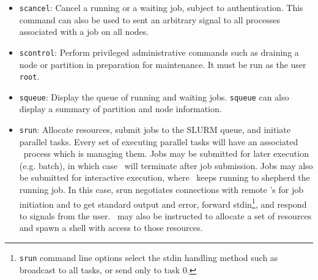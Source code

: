 \begin{itemize}
\item {\tt scancel}: Cancel a running or a waiting job, subject to
authentication. This command can also be used to sent an arbitrary 
signal to all processes associated with a job on all nodes.

\item {\tt scontrol}: Perform privileged administrative commands
such as draining a node or partition in preparation for maintenance. 
It must be run as the user {\tt root}.

\item {\tt squeue}: Display the queue of running and waiting jobs. 
{\tt squeue} can also display a summary of partition and node information.

\item {\tt srun}: Allocate resources, submit jobs to the SLURM queue,
and initiate parallel tasks. Every set of executing parallel tasks will
have an associated \srun\ process which is managing them. 
Jobs may be submitted for later execution (e.g. batch), in which case 
\srun\ will terminate after job submission. 
Jobs may also be submitted for interactive execution, where \srun\ keeps 
running to shepherd the running job. In this case, 
srun negotiates connections with remote \slurmd 's for job initiation and to
get standard output and error, forward stdin\footnote{{\tt srun} command
line options select the stdin handling method such as broadcast to all
tasks, or send only to task 0.}, and respond to signals from the user.
\srun\ may also be instructed to allocate a set of resources and
spawn a shell with access to those resources.


\end{itemize}

